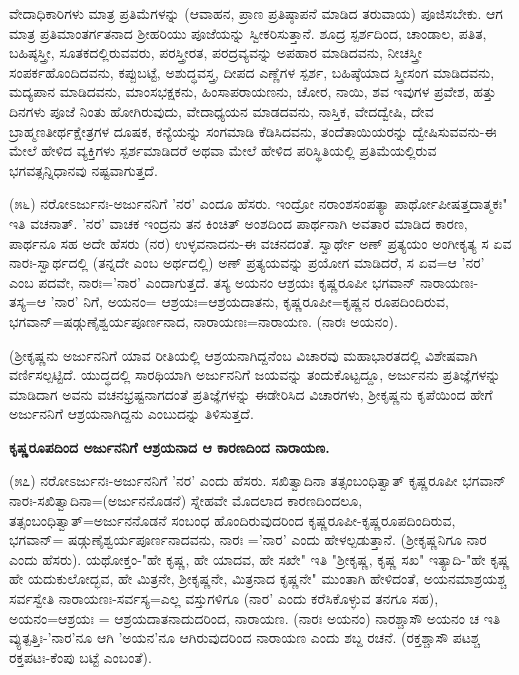 
ವೇದಾಧಿಕಾರಿಗಳು ಮಾತ್ರ ಪ್ರತಿಮೆಗಳನ್ನು (ಆವಾಹನ, ಪ್ರಾಣ ಪ್ರತಿಷ್ಠಾಪನೆ ಮಾಡಿದ ತರುವಾಯ) ಪೂಜಿಸಬೇಕು. ಆಗ ಮಾತ್ರ ಪ್ರತಿಮಾಂತರ್ಗತನಾದ ಶ‍್ರೀಹರಿಯು ಪೂಜೆಯನ್ನು ಸ್ವೀಕರಿಸುತ್ತಾನೆ. ಶೂದ್ರ ಸ್ಪರ್ಶದಿಂದ, ಚಾಂಡಾಲ, ಪತಿತ, ಬಹಿಷ್ಠಸ್ತ್ರೀ, ಸೂತಕದಲ್ಲಿರುವವರು, ಪರಸ್ತ್ರೀರತ, ಪರದ್ರವ್ಯವನ್ನು ಅಪಹಾರ ಮಾಡಿದವನು, ನೀಚಸ್ತ್ರೀ ಸಂಪರ್ಕಹೊಂದಿದವನು, ಕಪ್ಪುಬಟ್ಟೆ, ಅಶುದ್ಧವಸ್ತ್ರ, ದೀಪದ ಎಣ್ಣೆಗಳ ಸ್ಪರ್ಶ, ಬಹಿಷ್ಠೆಯಾದ ಸ್ತ್ರೀಸಂಗ ಮಾಡಿದವನು, ಮದ್ಯಪಾನ ಮಾಡಿದವನು, ಮಾಂಸಭಕ್ಷಕನು, ಹಿಂಸಾಪರಾಯಣನು, ಚೋರ, ನಾಯಿ, ಶವ ಇವುಗಳ ಪ್ರವೇಶ, ಹತ್ತು ದಿನಗಳು ಪೂಜೆ ನಿಂತು ಹೋಗಿರುವುದು, ವೇದಾಧ್ಯಯನ ಮಾಡದವನು, ನಾಸ್ತಿಕ, ವೇದದ್ವೇಷಿ, ದೇವ ಬ್ರಾಹ್ಮಣತೀರ್ಥಕ್ಷೇತ್ರಗಳ ದೂಷಕ, ಕನ್ಯೆಯನ್ನು ಸಂಗಮಾಡಿ ಕೆಡಿಸಿದವನು, ತಂದೆತಾಯಿಯರನ್ನು ದ್ವೇಷಿಸುವವನು-ಈ ಮೇಲೆ ಹೇಳಿದ ವ್ಯಕ್ತಿಗಳು ಸ್ಪರ್ಶಮಾಡಿದರೆ ಅಥವಾ ಮೇಲೆ ಹೇಳಿದ ಪರಿಸ್ಥಿತಿಯಲ್ಲಿ ಪ್ರತಿಮೆಯಲ್ಲಿರುವ ಭಗವತ್ಸನ್ನಿಧಾನವು ನಷ್ಟವಾಗುತ್ತದೆ.

(೫೬) ನರೋಽರ್ಜುನಃ-ಅರ್ಜುನನಿಗೆ 'ನರ' ಎಂದೂ ಹೆಸರು. ಇಂದ್ರೋ ನರಾಂಶಸಂಪತ್ಯಾ ಪಾರ್ಥೋಪೀಷತ್ತದಾತ್ಮಕಃ" ಇತಿ ವಚನಾತ್. 'ನರ' ವಾಚಕ ಇಂದ್ರನು ತನ ಕಿಂಚಿತ್ ಅಂಶದಿಂದ ಪಾರ್ಥನಾಗಿ ಅವತಾರ ಮಾಡಿದ ಕಾರಣ, ಪಾರ್ಥನೂ ಸಹ ಅದೇ ಹೆಸರು (ನರ) ಉಳ್ಳವನಾದನು-ಈ ವಚನದಂತೆ. ಸ್ವಾರ್ಥೇ ಅಣ್ ಪ್ರತ್ಯಯಂ ಅಂಗೀಕೃತ್ಯ ಸ ಏವ ನಾರಃ-ಸ್ವಾರ್ಥದಲ್ಲಿ (ತನ್ನದೇ ಎಂಬ ಅರ್ಥದಲ್ಲಿ) ಅಣ್ ಪ್ರತ್ಯಯವನ್ನು ಪ್ರಯೋಗ ಮಾಡಿದರೆ, ಸ ಏವ=ಆ 'ನರ' ಎಂಬ ಪದವೇ, ನಾರಃ='ನಾರ' ಎಂದಾಗುತ್ತದೆ. ತಸ್ಯ ಅಯನಂ ಆಶ್ರಯಃ ಕೃಷ್ಣರೂಪೀ ಭಗವಾನ್ ನಾರಾಯಣಃ-ತಸ್ಯ=ಆ 'ನಾರ' ನಿಗೆ, ಅಯನಂ= ಆಶ್ರಯಃ=ಆಶ್ರಯದಾತನು, ಕೃಷ್ಣರೂಪೀ=ಕೃಷ್ಣನ ರೂಪದಿಂದಿರುವ, ಭಗವಾನ್=ಷಡ್ಗುಣೈಶ್ವರ್ಯಪೂರ್ಣನಾದ, ನಾರಾಯಣಃ=ನಾರಾಯಣ. (ನಾರಃ ಅಯನಂ).

(ಶ‍್ರೀಕೃಷ್ಣನು ಅರ್ಜುನನಿಗೆ ಯಾವ ರೀತಿಯಲ್ಲಿ ಆಶ್ರಯನಾಗಿದ್ದನೆಂಬ ವಿಚಾರವು ಮಹಾಭಾರತದಲ್ಲಿ ವಿಶೇಷವಾಗಿ ವರ್ಣಿಸಲ್ಪಟ್ಟಿದೆ. ಯುದ್ಧದಲ್ಲಿ ಸಾರಥಿಯಾಗಿ ಅರ್ಜುನನಿಗೆ ಜಯವನ್ನು ತಂದುಕೊಟ್ಟದ್ದೂ, ಅರ್ಜುನನು ಪ್ರತಿಜ್ಞೆಗಳನ್ನು ಮಾಡಿದಾಗ ಅವನು ವಚನಭ್ರಷ್ಟನಾಗದಂತೆ ಪ್ರತಿಜ್ಞೆಗಳನ್ನು ಈಡೇರಿಸಿದ ವಿಚಾರಗಳು, ಶ‍್ರೀಕೃಷ್ಣನು ಕೃಪೆಯಿಂದ ಹೇಗೆ ಅರ್ಜುನನಿಗೆ ಆಶ್ರಯನಾಗಿದ್ದನು ಎಂಬುದನ್ನು ತಿಳಿಸುತ್ತದೆ.

\begin{center}
\textbf{ಕೃಷ್ಣರೂಪದಿಂದ ಅರ್ಜುನನಿಗೆ ಆಶ್ರಯನಾದ ಆ ಕಾರಣದಿಂದ ನಾರಾಯಣ.}
\end{center}

(೫೭) ನರೋಽರ್ಜುನಃ-ಅರ್ಜುನನಿಗೆ 'ನರ' ಎಂದು ಹೆಸರು. ಸಖಿತ್ವಾದಿನಾ ತತ್ಸಂಬಂಧಿತ್ವಾತ್ ಕೃಷ್ಣರೂಪೀ ಭಗವಾನ್ ನಾರಃ-ಸಖಿತ್ವಾದಿನಾ=(ಅರ್ಜುನನೊಡನೆ) ಸ್ನೇಹವೇ ಮೊದಲಾದ ಕಾರಣದಿಂದಲೂ, ತತ್ಸಂಬಂಧಿತ್ವಾತ್=ಅರ್ಜುನನೊಡನೆ ಸಂಬಂಧ ಹೊಂದಿರುವುದರಿಂದ ಕೃಷ್ಣರೂಪೀ-ಕೃಷ್ಣರೂಪದಿಂದಿರುವ, ಭಗವಾನ್= ಷಡ್ಗುಣೈಶ್ವರ್ಯಪೂರ್ಣನಾದವನು, ನಾರಃ ='ನಾರ' ಎಂದು ಹೇಳಲ್ಪಡುತ್ತಾನೆ. (ಶ‍್ರೀಕೃಷ್ಣನಿಗೂ ನಾರ ಎಂದು ಹೆಸರು). ಯಥೋಕ್ತಂ-"ಹೇ ಕೃಷ್ಣ, ಹೇ ಯಾದವ, ಹೇ ಸಖೇ" ಇತಿ "ಶ‍್ರೀಕೃಷ್ಣ, ಕೃಷ್ಣ ಸಖ" ಇತ್ಯಾದಿ-"ಹೇ ಕೃಷ್ಣ ಹೇ ಯದುಕುಲೋದ್ಭವ, ಹೇ ಮಿತ್ರನೇ, ಶ‍್ರೀಕೃಷ್ಣನೇ, ಮಿತ್ರನಾದ ಕೃಷ್ಣನೇ" ಮುಂತಾಗಿ ಹೇಳಿದಂತೆ, ಅಯನಮಾಶ್ರಯಶ್ಚ ಸರ್ವಸ್ವೇತಿ ನಾರಾಯಣಃ-ಸರ್ವಸ್ಯ=ಎಲ್ಲ ವಸ್ತುಗಳಿಗೂ (ನಾರ' ಎಂದು ಕರೆಸಿಕೊಳ್ಳುವ ತನಗೂ ಸಹ), ಅಯನಂ=ಆಶ್ರಯಃ = ಆಶ್ರಯದಾತನಾದುದರಿಂದ, ನಾರಾಯಣ. (ನಾರಃ ಅಯನಂ) ನಾರಶ್ಚಾಸೌ ಅಯನಂ ಚ ಇತಿ ವ್ಯುತ್ಪತ್ತಿಃ-'ನಾರ'ನೂ ಆಗಿ 'ಅಯನ'ನೂ ಆಗಿರುವುದರಿಂದ ನಾರಾಯಣ ಎಂದು ಶಬ್ದ ರಚನೆ. (ರಕ್ತಶ್ಚಾಸೌ ಪಟಶ್ಚ ರಕ್ತಪಟಃ-ಕೆಂಪು ಬಟ್ಟೆ ಎಂಬಂತೆ).

